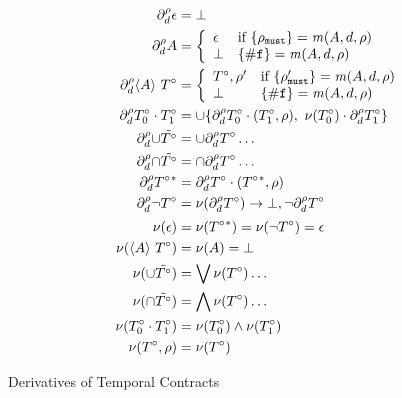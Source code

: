   {\begin{align*}
      \partial_{d}^{\rho}{\epsilon} &= \bot
      \\
      \partial_{d}^{\rho}{A} &= \left\{
        \begin{array}{ll}
          \epsilon & \text{if } \{\rho_{\tt must}\} = \mathit{m}(A, d, \rho) \\
          \bot & \{{\tt \#f}\} = \mathit{m}(A, d, \rho)
        \end{array}\right.
      \\
      \partial_{d}^{\rho}{\langle A\rangle\ T^\circ} &=
      \left\{\begin{array}{ll}
          T^\circ,\rho' & \text{if } \{\rho'_{\tt must}\} = \mathit{m}(A, d, \rho) \\
          \bot & \{{\tt \#f}\} = \mathit{m}(A, d, \rho)
        \end{array}\right.
      \\
      \partial_{d}^{\rho}{T^\circ_0 \cdot T^\circ_1} &=
      \cup \{\partial_{d}^{\rho}{T^\circ_0} \cdot (T^\circ_1,\rho),\
          \nu(T^\circ_0) \cdot \partial_{d}^{\rho}{T^\circ_1}\}
      \\
      \partial_{d}^{\rho}{\cup \tilde{T^\circ}} &=
      \cup \partial_{d}^{\rho}{T^\circ}\ldots
      \\
      \partial_{d}^{\rho}{\cap \tilde{T^\circ}} &=
      \cap \partial_{d}^{\rho}{T^\circ}\ldots
      \\
      \partial_{d}^{\rho}{T^\circ{}^*} &=
      \partial_{d}^{\rho}{T^\circ} \cdot (T^\circ{}^*,\rho)
      \\
      \partial_{d}^{\rho}{\neg T^\circ} &=
      \nu(\partial_{d}^{\rho}{T^\circ}) \to \bot,
      \neg \partial_{d}^{\rho}{T^\circ}
      \\[2pt]
      \nu(\epsilon) &= \nu(T^\circ{}^*) =
      \nu(\neg T^\circ) = \epsilon
      \\
      \nu(\langle A\rangle\ T^\circ) &= \nu(A) = \bot
      \\
      \nu(\cup \tilde{T^\circ}) &=
      \bigvee{\nu(T^\circ)\ldots}
      \\
      \nu(\cap \tilde{T^\circ}) &=
      \bigwedge{\nu(T^\circ)\ldots}
      \\
      \nu(T^\circ_0 \cdot T^\circ_1) &=
      \nu(T^\circ_0)\wedge \nu(T^\circ_1)
      \\
      \nu(T^\circ,\rho) &= \nu(T^\circ)
    \end{align*}}{\caption{Derivatives of Temporal Contracts}\label{fig:tcon-deriv}}

